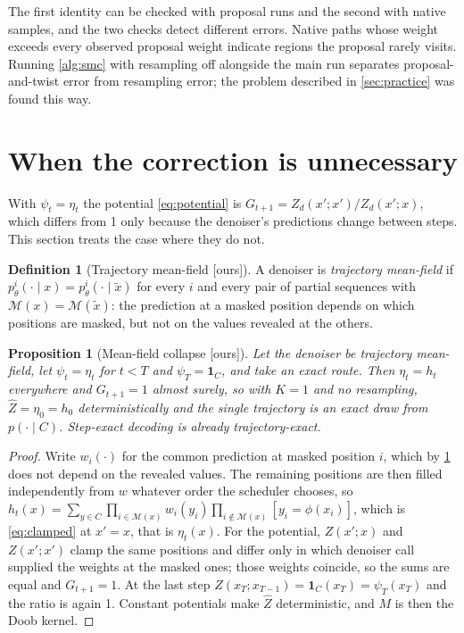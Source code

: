 \documentclass[11pt]{article}
\newtheorem{proposition}[theorem]{Proposition}
\theoremstyle{definition}
\newtheorem{definition}[theorem]{Definition}
\newcommand{\M}{\mathcal{M}}
\newcommand{\one}{\mathbf{1}}
\newcommand{\Zh}{\widehat Z}
\newcommand{\status}[1]{\textsf{\small[#1]}}
\begin{document}
The first identity can be checked with proposal runs and the second with native samples, and the two checks
detect different errors. Native paths whose weight exceeds every observed proposal weight indicate regions the
proposal rarely visits. Running \cref{alg:smc} with resampling off alongside the main run separates
proposal-and-twist error from resampling error; the problem described in \cref{sec:practice} was found this way.

\section{When the correction is unnecessary}\label{sec:meanfield}

With $\psi_t=\eta_t$ the potential \eqref{eq:potential} is $G_{t+1}=Z_d(x';x')/Z_d(x';x)$, which differs from 1
only because the denoiser's predictions change between steps. This section treats the case where they do not.

\begin{definition}[Trajectory mean-field \status{ours}]\label{def:mf}
A denoiser is \emph{trajectory mean-field} if $p^i_\theta(\cdot\mid x)=p^i_\theta(\cdot\mid\tilde x)$ for every $i$
and every pair of partial sequences with $\M(x)=\M(\tilde x)$: the prediction at a masked position depends on
which positions are masked, but not on the values revealed at the others.
\end{definition}

\begin{proposition}[Mean-field collapse \status{ours}]\label{prop:mf}
Let the denoiser be trajectory mean-field, let $\psi_t=\eta_t$ for $t<T$ and $\psi_T=\one_C$, and take an exact
route. Then $\eta_t=h_t$ everywhere and $G_{t+1}=1$ almost surely, so with $K=1$ and no resampling,
$\Zh=\eta_0=h_0$ deterministically and the single trajectory is an exact draw from $p(\cdot\mid C)$. Step-exact
decoding is already trajectory-exact.
\end{proposition}
\begin{proof}
Write $w_i(\cdot)$ for the common prediction at masked position $i$, which by \cref{def:mf} does not depend on the
revealed values. The remaining positions are then filled independently from $w$ whatever order the scheduler
chooses, so $h_t(x)=\sum_{y\in C}\prod_{i\in\M(x)}w_i(y_i)\prod_{i\notin\M(x)}[y_i=\phi(x_i)]$, which is
\eqref{eq:clamped} at $x'=x$, that is $\eta_t(x)$. For the potential, $Z(x';x)$ and $Z(x';x')$ clamp the same
positions and differ only in which denoiser call supplied the weights at the masked ones; those weights coincide,
so the sums are equal and $G_{t+1}=1$. At the last step $Z(x_T;x_{T-1})=\one_C(x_T)=\psi_T(x_T)$ and the ratio is
again 1. Constant potentials make $\Zh$ deterministic, and $M$ is then the Doob kernel.
\end{proof}
\end{document}
